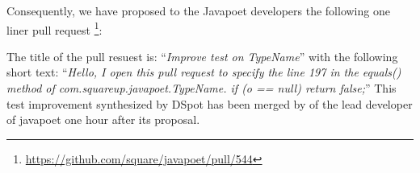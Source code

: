Consequently, we have proposed to the Javapoet developers the following one liner pull request \footnote{\url{https://github.com/square/javapoet/pull/544}}:
\begin{figure}[H]
	\centering
\end{figure}
The title of the pull resuest is: ``\emph{Improve test on TypeName}'' with the following short text: ``\emph{Hello, I open this pull request to specify the line 197 in the equals() method of com.squareup.javapoet.TypeName. if (o == null) return false;}''
This test improvement synthesized by DSpot has been merged by of the lead developer of javapoet one hour after its proposal.


